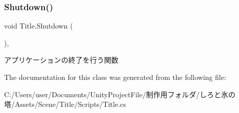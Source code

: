 \subsubsection{\texorpdfstring{Shutdown()}{Shutdown()}}
{\footnotesize\ttfamily void Title.\+Shutdown (\begin{DoxyParamCaption}{ }\end{DoxyParamCaption})\hspace{0.3cm}{\ttfamily [inline]}, {\ttfamily [private]}}



アプリケーションの終了を行う関数 



The documentation for this class was generated from the following file\+:\begin{DoxyCompactItemize}
\item 
C\+:/\+Users/user/\+Documents/\+Unity\+Project\+File/制作用フォルダ/しろと氷の塔/\+Assets/\+Scene/\+Title/\+Scripts/Title.\+cs\end{DoxyCompactItemize}
